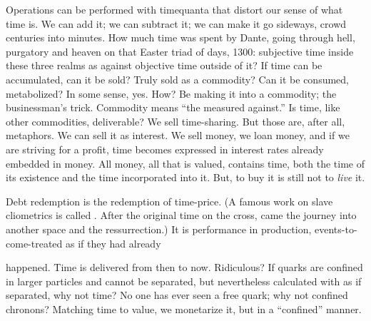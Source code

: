 Operations can be performed with timequanta that distort our sense of what time is.
We can add it; we can subtract it; we can
make it go sideways, crowd centuries into
minutes. How much time was spent by
Dante, going through hell, purgatory and
heaven on that Easter triad of days, 1300:
subjective time inside these three realms as
against objective time outside of it? If time
can be accumulated, can it be sold? Truly
sold as a commodity? Can it be consumed,
metabolized? In some sense, yes. How? Be %
making it into a commodity; the businessman's trick. Commodity means \enquote{the measured against.} Is time, like other commodities, deliverable? We sell time-sharing. But those are, after all, metaphors. We can sell it
as interest. We sell money, we loan money,
and if we are striving for a profit, time
becomes expressed in interest rates already
embedded in money. All money, all that is
valued, contains time, both the time of its
existence and the time incorporated into it.
But, to buy it is still not to \emph{live} it.

Debt redemption is the redemption of
time-price. (A famous work on slave cliometrics is called . After the original time on the cross, came the
journey into another space and the ressurrection.) It is performance in production,
events-to-come-treated as if they had already

happened. Time is delivered from then to
now. Ridiculous? If quarks are confined in
larger particles and cannot be separated, but
nevertheless calculated with as if separated,
why not time? No one has ever seen a free
quark; why not confined chronons? Matching time to value, we monetarize it, but in a
\enquote{confined} manner.

